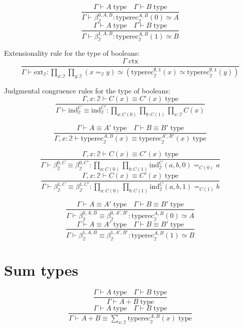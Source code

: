 \documentclass{book}
\begin{document}
$$\frac{\Gamma \vdash A \; \mathrm{type} \quad \Gamma \vdash B \; \mathrm{type}}{\Gamma \vdash \beta_\mathbb{2}^{0, A, B}:\mathrm{typerec}_\mathbb{2}^{A, B}(0) \simeq A}$$
$$\frac{\Gamma \vdash A \; \mathrm{type} \quad \Gamma \vdash B \; \mathrm{type}}{\Gamma \vdash \beta_\mathbb{2}^{1, A, B}:\mathrm{typerec}_\mathbb{2}^{A, B}(1) \simeq B}$$

Extensionality rule for the type of booleans:
$$\frac{\Gamma \; \mathrm{ctx}}{\Gamma \vdash \mathrm{ext}_\mathbb{2}:\prod_{x:\mathbb{2}} \prod_{y:\mathbb{2}} (x =_{\mathbb{2}} y) \simeq (\mathrm{typerec}_\mathbb{2}^{\emptyset, \mathbb{1}}(x) \simeq \mathrm{typerec}_\mathbb{2}^{\emptyset, \mathbb{1}}(y))}$$

Judgmental congruence rules for the type of booleans:
$$\frac{\Gamma, x:\mathbb{2} \vdash C(x) \equiv C'(x) \; \mathrm{type}}{\Gamma \vdash \mathrm{ind}_\mathbb{2}^C \equiv \mathrm{ind}_\mathbb{2}^{C'}:\prod_{a:C(0)} \prod_{b:C(1)} \prod_{x:\mathbb{2}} C(x)}$$

$$\frac{\Gamma \vdash A \equiv A' \; \mathrm{type} \quad \Gamma \vdash B \equiv B' \; \mathrm{type}}{\Gamma, x:\mathbb{2} \vdash \mathrm{typerec}_\mathbb{2}^{A, B}(x) \equiv \mathrm{typerec}_\mathbb{2}^{A', B'}(x) \; \mathrm{type}}$$

$$\frac{\Gamma, x:\mathbb{2} \vdash C(x) \equiv C'(x) \; \mathrm{type}}{\Gamma \vdash \beta_\mathbb{2}^{0, C} \equiv \beta_\mathbb{2}^{0, C'}:\prod_{a:C(0)} \prod_{b:C(1)} \mathrm{ind}_\mathbb{2}^C(a, b, 0) =_{C(0)} a}$$
$$\frac{\Gamma, x:\mathbb{2} \vdash C(x) \equiv C'(x) \; \mathrm{type}}{\Gamma \vdash \beta_\mathbb{2}^{1, C} \equiv \beta_\mathbb{2}^{1, C'}:\prod_{a:C(0)} \prod_{b:C(1)} \mathrm{ind}_\mathbb{2}^C(a, b, 1) =_{C(1)} b}$$

$$\frac{\Gamma \vdash A \equiv A' \; \mathrm{type} \quad \Gamma \vdash B \equiv B' \; \mathrm{type}}{\Gamma \vdash \beta_\mathbb{2}^{0, A, B} \equiv \beta_\mathbb{2}^{0, A', B'}:\mathrm{typerec}_\mathbb{2}^{A, B}(0) \simeq A}$$
$$\frac{\Gamma \vdash A \equiv A' \; \mathrm{type} \quad \Gamma \vdash B \equiv B' \; \mathrm{type}}{\Gamma \vdash \beta_\mathbb{2}^{1, A, B} \equiv \beta_\mathbb{2}^{1, A', B'}:\mathrm{typerec}_\mathbb{2}^{A, B}(1) \simeq B}$$

\section{Sum types}
$$\frac{\Gamma \vdash A \; \mathrm{type} \quad \Gamma \vdash B \; \mathrm{type}}{\Gamma \vdash A + B \; \mathrm{type}}$$
$$\frac{\Gamma \vdash A \; \mathrm{type} \quad \Gamma \vdash B \; \mathrm{type}}{\Gamma \vdash A + B \equiv \sum_{x:\mathbb{2}} \mathrm{typerec}_\mathbb{2}^{A, B}(x) \; \mathrm{type}}$$
\end{document}
